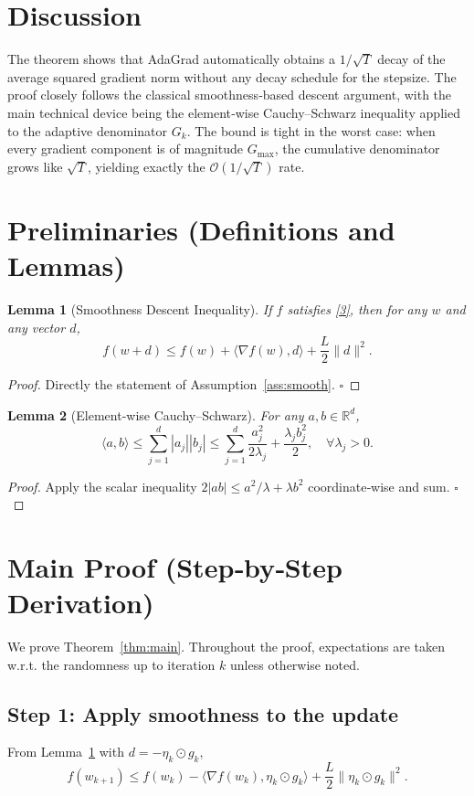 \documentclass{article}
\newtheorem{lemma}{Lemma}
\newcommand{\R}{\mathbb{R}}
\begin{document}
\section*{Discussion}
The theorem shows that AdaGrad automatically obtains a $1/\sqrt{T}$ decay of the average squared gradient norm without any decay schedule for the stepsize. The proof closely follows the classical smoothness‑based descent argument, with the main technical device being the element‑wise Cauchy–Schwarz inequality applied to the adaptive denominator $G_k$. The bound is tight in the worst case: when every gradient component is of magnitude $G_{\max}$, the cumulative denominator grows like $\sqrt{T}$, yielding exactly the $\mathcal{O}(1/\sqrt{T})$ rate.

\newpage
\section*{Preliminaries (Definitions and Lemmas)}
\begin{lemma}[Smoothness Descent Inequality]\label{lem:smooth}
If $f$ satisfies \eqref{3}, then for any $w$ and any vector $d$,
\[
f(w+d)\le f(w)+\langle\nabla f(w),d\rangle+\frac{L}{2}\|d\|^{2}.
\tag{7}
\]
\end{lemma}
\begin{proof}
Directly the statement of Assumption~\ref{ass:smooth}. \hfill $\square$
\end{proof}

\begin{lemma}[Element‑wise Cauchy–Schwarz]\label{lem:cs}
For any $a,b\in\R^{d}$,
\[
\langle a,b\rangle \le \sum_{j=1}^{d}|a_j||b_j|
\le \sum_{j=1}^{d}\frac{a_j^{2}}{2\lambda_j}+ \frac{\lambda_j b_j^{2}}{2},
\quad\forall \lambda_j>0.
\tag{8}
\]
\end{lemma}
\begin{proof}
Apply the scalar inequality $2|ab|\le a^{2}/\lambda +\lambda b^{2}$ coordinate‑wise and sum. \hfill $\square$
\end{proof}

\section*{Main Proof (Step‑by‑Step Derivation)}
We prove Theorem~\ref{thm:main}. Throughout the proof, expectations are taken w.r.t. the randomness up to iteration $k$ unless otherwise noted.

\subsection*{Step 1: Apply smoothness to the update}
From Lemma~\ref{lem:smooth} with $d = -\eta_k\odot g_k$,
\[
f(w_{k+1})\le f(w_k)-\langle\nabla f(w_k),\eta_k\odot g_k\rangle
+\frac{L}{2}\|\eta_k\odot g_k\|^{2}. \tag{9}
\]
\end{document}
